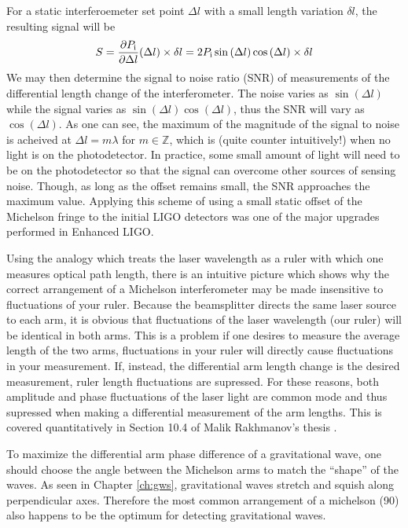 For a static interferoemeter set point $\Delta l$ with a small length variation $\delta l$, the resulting signal will be
\begin{equation}
S=\frac{\partial P_{\rm i}}{\partial \Delta l}(\Delta l) \times \delta l = 2P_{\rm i}\sin{(\Delta l)}\cos{(\Delta l)}\times \delta l
\end{equation}
We may then determine the signal to noise ratio (SNR) of measurements of the differential length change of the interferometer. %
The noise varies as $\sin(\Delta l)$ while the signal varies as $\sin(\Delta l)\cos(\Delta l)$, thus the SNR will vary as $\cos(\Delta l)$. %
As one can see, the maximum of the magnitude of the signal to noise is acheived at $\Delta l = m \lambda$ for $m \in \mathbb{Z}$, which is (quite counter intuitively!) when no light is on the photodetector. %
In practice, some small amount of light will need to be on the photodetector so that the signal can overcome other sources of sensing noise. %
Though, as long as the offset remains small, the SNR approaches the maximum value. %
Applying this scheme of using a small static offset of the Michelson fringe to the initial LIGO detectors was one of the major upgrades performed in Enhanced LIGO.

Using the analogy which treats the laser wavelength as a ruler with which one measures optical path length, there is an intuitive picture which shows why the correct arrangement of a Michelson interferometer may be made insensitive to fluctuations of your ruler. %
Because the beamsplitter directs the same laser source to each arm, it is obvious that fluctuations of the laser wavelength (our ruler) will be identical in both arms. %
This is a problem if one desires to measure the average length of the two arms, fluctuations in your ruler will directly cause fluctuations in your measurement. %
If, instead, the differential arm length change is the desired measurement, ruler length fluctuations are supressed. %
For these reasons, both amplitude and phase fluctuations of the laser light are common mode and thus supressed when making a differential measurement of the arm lengths. %
This is covered quantitatively in Section 10.4 of Malik Rakhmanov's thesis \cite{Rakhmanov}.

To maximize the differential arm phase difference of a gravitational wave, one should choose the angle between the Michelson arms to match the ``shape'' %
of the waves. %
As seen in Chapter \ref{ch:gws}, gravitational waves stretch and squish along perpendicular axes. %
Therefore the most common arrangement of a michelson (90\degrees{}) also happens to be the optimum for detecting gravitational waves.

